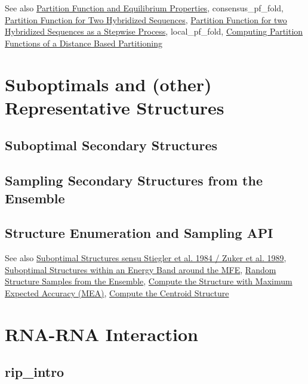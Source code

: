 \begin{DoxySeeAlso}{See also}
\hyperlink{group__pf__fold}{Partition Function and Equilibrium Properties}, consensus\+\_\+pf\+\_\+fold, \hyperlink{group__pf__cofold}{Partition Function for Two Hybridized Sequences}, \hyperlink{group__up__cofold}{Partition Function for two Hybridized Sequences as a Stepwise Process}, local\+\_\+pf\+\_\+fold, \hyperlink{group__kl__neighborhood__pf}{Computing Partition Functions of a Distance Based Partitioning}
\end{DoxySeeAlso}
 \hypertarget{suboptimal_structures}{}\section{Suboptimals and (other) Representative Structures}\label{suboptimal_structures}
\hypertarget{suboptimal_structures_sec_suboptimals}{}\subsection{Suboptimal Secondary Structures}\label{suboptimal_structures_sec_suboptimals}
\hypertarget{suboptimal_structures_sec_samples}{}\subsection{Sampling Secondary Structures from the Ensemble}\label{suboptimal_structures_sec_samples}
\hypertarget{suboptimal_structures_sec_suboptimals_api}{}\subsection{Structure Enumeration and Sampling A\+PI}\label{suboptimal_structures_sec_suboptimals_api}
\begin{DoxySeeAlso}{See also}
\hyperlink{group__subopt__zuker}{Suboptimal Structures sensu Stiegler et al. 1984 / Zuker et al. 1989}, \hyperlink{group__subopt__wuchty}{Suboptimal Structures within an Energy Band around the M\+FE}, \hyperlink{group__subopt__stochbt}{Random Structure Samples from the Ensemble}, \hyperlink{group__mea__fold}{Compute the Structure with Maximum Expected Accuracy (M\+EA)}, \hyperlink{group__centroid__fold}{Compute the Centroid Structure}
\end{DoxySeeAlso}
 \hypertarget{rip}{}\section{R\+N\+A-\/\+R\+NA Interaction}\label{rip}
\hypertarget{rip_rip_intro}{}\subsection{rip\+\_\+intro}\label{rip_rip_intro}
